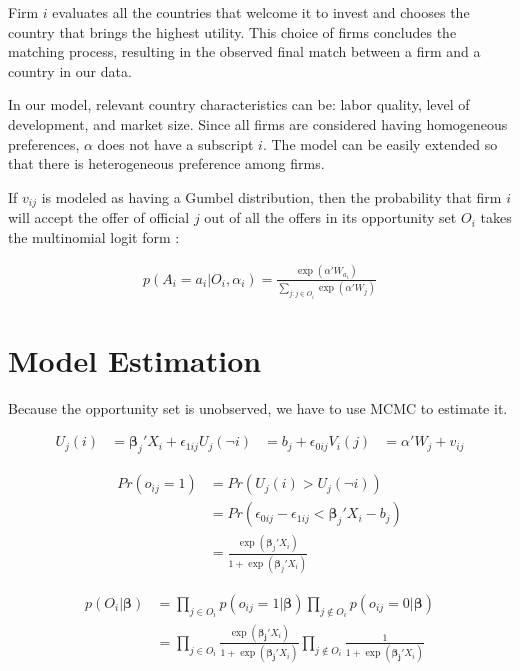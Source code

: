 Firm $i$ evaluates all the countries that welcome it to invest and chooses the country that brings the highest utility. This choice of firms concludes the matching process, resulting in the observed final match between a firm and a country in our data.

In our model, relevant country characteristics can be: labor quality, level of development, and market size. Since all firms are considered having homogeneous preferences, $\alpha$ does not have a subscript $i$. The model can be easily extended so that there is heterogeneous preference among firms.

If $v_{ij}$ is modeled as having a Gumbel distribution, then the probability that firm $i$ will accept the offer of official $j$ out of all the offers in its opportunity set $O_i$ takes the multinomial logit form \citep{Cameron2005}:

\begin{align}
p(A_i = a_i | O_i, \alpha_i) = \frac{\exp(\alpha'W_{a_i})}{\sum\limits_{j:j \in O_i} \exp(\alpha'W_j)} \label{eq:conditional_probability_of_accept}
\end{align}

\section{Model Estimation}

Because the opportunity set is unobserved, we have to use MCMC to estimate it.

\begin{align}
U_j(i) &= \bm{\beta}_j' X_i + \epsilon_{1ij}
U_j(\neg i) &= b_j + \epsilon_{0ij}
V_i(j) &= \alpha' W_{j} + v_{ij}
\end{align}

\begin{align}
Pr(o_{ij} = 1) &= Pr(U_j(i) > U_j(\neg i)) \\
&= Pr(\epsilon_{0ij} - \epsilon_{1ij} <  \bm{\beta}_j ' X_i - b_j) \\
&= \frac{\exp({\bm{\beta}_j'X_i})}{1 + \exp({\bm{\beta}_j'X_i})} \label{eq:prob_offer_ij}
\end{align}

\begin{align}
p(O_i | \bm{\beta}) &= \prod_{j \in O_i} p(o_{ij} = 1 | \bm{\beta}) \prod_{j \notin O_i} p(o_{ij} = 0 | \bm{\beta}) \\
&= \prod_{j \in O_i} \frac{\exp(\bm{\beta_j} ' X_i)}{1 + \exp(\bm{\beta_j}' X_i)}
 \prod_{j \notin O_i} \frac{1}{1 + \exp(\bm{\beta_j}' X_i)} \label{eq:conditional_probability_of_offer}
\end{align}

